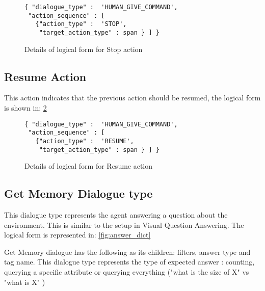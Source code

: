 \begin{figure}[ht]
    \centering
    \fontsize{8pt}{8pt}\selectfont
    \begin{verbatim}
{ "dialogue_type" :  'HUMAN_GIVE_COMMAND',
 "action_sequence" : [
   {"action_type" :  'STOP',
    "target_action_type" : span } ] }
    \end{verbatim}
    \vspace{-20pt}
    \caption{Details of logical form for Stop action}
    \vspace{-8pt}
    \label{fig:stop_dict}
\end{figure}

\subsection{Resume Action}
This action indicates that the previous action should be resumed, the logical form is shown in: \ref{fig:resume_dict}

\begin{figure}[ht]
    \centering
    \fontsize{8pt}{8pt}\selectfont
    \begin{verbatim}
{ "dialogue_type" :  'HUMAN_GIVE_COMMAND',
 "action_sequence" : [
   {"action_type" :  'RESUME',
    "target_action_type" : span } ] }
    \end{verbatim}
    \vspace{-20pt}
    \caption{Details of logical form for Resume action}
    \vspace{-8pt}
    \label{fig:resume_dict}
\end{figure}

\subsection{Get Memory Dialogue type}
This dialogue type represents the agent answering a question about the environment.
This is similar to the setup in Visual Question Answering. The logical form is represented in: \ref{fig:answer_dict}

Get Memory dialogue has the following as its children: filters, answer type and tag name.
This dialogue type represents the type of expected answer : counting, querying a specific attribute or querying everything ("what is the size of X" vs "what is X" )

